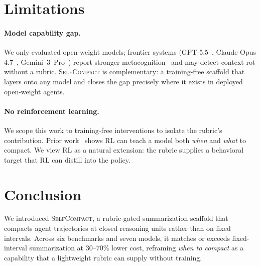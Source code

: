 \documentclass{article}
\newcommand{\method}{\textsc{{SelfCompact}}}
\begin{document}
\section{Limitations}
\label{sec:limitations}

\paragraph{Model capability gap.} We only evaluated open-weight models;
frontier systems (GPT-5.5~\citep{openai2026gpt55}, Claude Opus
4.7~\citep{anthropic2026opus47}, Gemini~3~Pro~\citep{google2026gemini31pro})
report stronger metacognition~\citep{lindsey2025introspection} and may
detect context rot without a rubric. \method{} is complementary: a
training-free scaffold that layers onto any model and closes the gap
precisely where it exists in deployed open-weight agents.


\paragraph{No reinforcement learning.} We scope this work to
training-free interventions to isolate the rubric's contribution. Prior
work~\citep{kontonis2026memento, zhu2026lightthinkerreasoningcompressionmemory} shows RL can teach a model both
\emph{when} and \emph{what} to compact. We view RL as a natural
extension: the rubric supplies a behavioral target that RL can distill
into the policy.

\section{Conclusion}

We introduced \method{}, a rubric-gated summarization scaffold that
compacts agent trajectories at closed reasoning units rather than on
fixed intervals. Across six benchmarks and seven models, it matches
or exceeds fixed-interval summarization at 30--70\% lower cost,
reframing \emph{when to compact} as a capability that a lightweight
rubric can supply without training.
\end{document}
